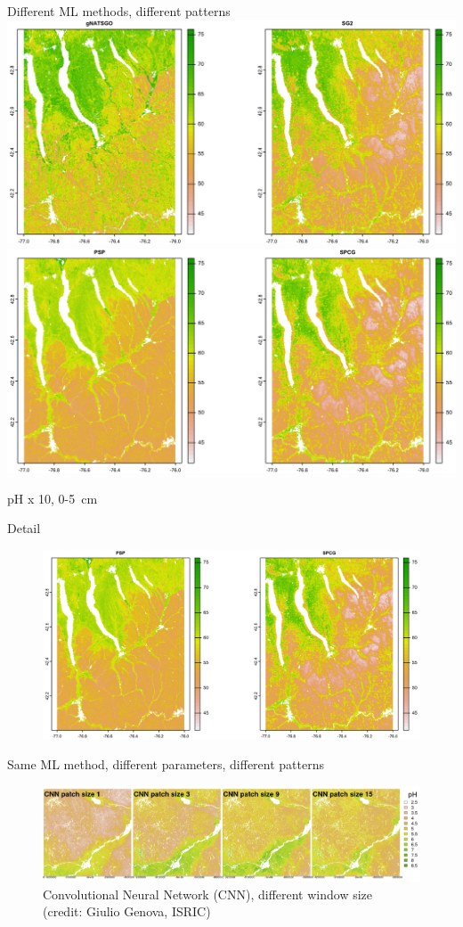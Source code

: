\documentclass[aspectratio=169]{beamer}
\begin{document}
\begin{frame}{Different ML methods, different patterns}
        \includegraphics[width=0.49\linewidth]{./graphics_david/Fig07a.png}
        \includegraphics[width=0.49\linewidth]{./graphics_david/Fig07b.png}
\par        
{\hfill        
        {pH x 10, 0-5~cm} \hfill}
\end{frame}

\begin{frame}{Detail}
\begin{figure}
    \centering
    \includegraphics[height=0.72\textheight]{./graphics_david/Fig07b.png}
 \end{figure}
\end{frame}


\begin{frame}{Same ML method, different parameters, different patterns}
    \begin{figure}
        \centering
        \includegraphics[width=\textwidth]{./graphics_david/GenovaPosterFig1a.png}
        \\{Convolutional Neural Network (CNN), different window size\\(credit: Giulio Genova, ISRIC)}
    \end{figure}
\end{frame}
\end{document}
